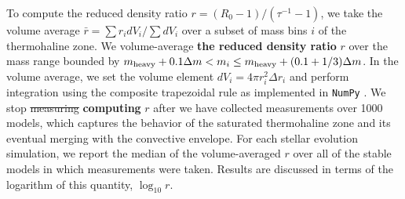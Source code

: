 To compute the reduced density ratio $r = (R_0 - 1)/(\tau^{-1} - 1)$, we take the volume average $\bar{r} = \sum r_i dV_i / \sum dV_i$ over a subset of mass bins $i$ of the thermohaline zone.
We volume-average \textbf{the reduced density ratio} $r$ over the mass range bounded by $m_{\rm{heavy}} + 0.1\Delta m  < m_i \leq m_{\rm heavy} + (0.1 + 1/3)\Delta m$.
In the volume average, we set the volume element $dV_i = 4\pi r_i^2 \Delta r_i$ and perform integration using the composite trapezoidal rule as implemented in \texttt{NumPy} \citep{numpy}.
We stop \sout{measuring} \textbf{computing} $r$ after we have collected measurements over 1000 models, which captures the behavior of the saturated thermohaline zone and its eventual merging with the convective envelope.
For each stellar evolution simulation, we report the median of the volume-averaged $r$ over all of the stable models in which measurements were taken. 
Results are discussed in terms of the logarithm of this quantity, $\log_{10} r$.
